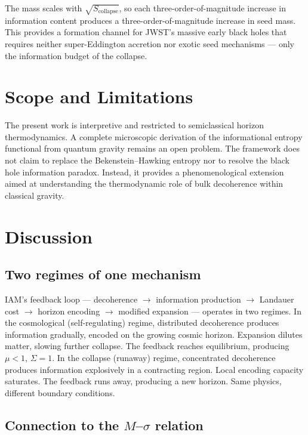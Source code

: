 \documentclass[12pt,a4paper]{article}
\begin{document}
The mass scales with $\sqrt{S_\mathrm{collapse}}$, so each three-order-of-magnitude
increase in information content produces a three-order-of-magnitude increase in
seed mass. This provides a formation channel for JWST's massive early black holes
that requires neither super-Eddington accretion nor exotic seed mechanisms --- only
the information budget of the collapse.


\section{Scope and Limitations}

The present work is interpretive and restricted to semiclassical horizon
thermodynamics. A complete microscopic derivation of the informational
entropy functional from quantum gravity remains an open problem.
The framework does not claim to replace the Bekenstein--Hawking entropy
nor to resolve the black hole information paradox. Instead, it provides
a phenomenological extension aimed at understanding the thermodynamic
role of bulk decoherence within classical gravity.

\section{Discussion}

\subsection{Two regimes of one mechanism}

IAM's feedback loop --- decoherence $\to$ information production $\to$ Landauer
cost $\to$ horizon encoding $\to$ modified expansion --- operates in two regimes.
In the cosmological (self-regulating) regime, distributed decoherence produces
information gradually, encoded on the growing cosmic horizon. Expansion dilutes
matter, slowing further collapse. The feedback reaches equilibrium, producing
$\mu < 1$, $\Sigma = 1$. In the collapse (runaway) regime, concentrated
decoherence produces information explosively in a contracting region. Local
encoding capacity saturates. The feedback runs away, producing a new horizon.
Same physics, different boundary conditions.

\subsection{Connection to the $M$--$\sigma$ relation}
\end{document}
